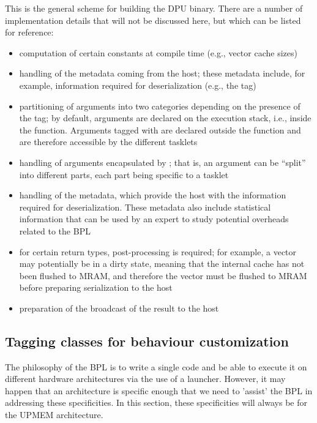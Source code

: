 This is the general scheme for building the DPU binary. There are a number of implementation details that will not be discussed here, but which can be listed for reference:

\begin{itemize}

\item computation of certain constants at compile time (e.g., vector cache sizes)

\item handling of the  metadata coming from the host; these metadata include, for example, information required for deserialization (e.g., the  tag)

\item partitioning of arguments into two categories depending on the presence of the  tag; by default, arguments are declared on the execution stack, i.e., inside the  function. Arguments tagged with  are declared outside the  function and are therefore accessible 
by the different tasklets

\item handling of arguments encapsulated by ; that is, an argument can be “split” into different parts, each part being specific to a tasklet

\item handling of the  metadata, which provide the host with the information required for deserialization. These metadata also include statistical information that can be used by an expert to study potential overheads related to the BPL

\item for certain return types, post-processing is required; for example, a vector may potentially be in a dirty state, meaning that the internal cache has not been flushed to MRAM, and therefore the vector must be flushed to MRAM before preparing serialization to the host

\item preparation of the broadcast of the result to the host

\end{itemize}	

\subsection{Tagging classes for behaviour customization}

The philosophy of the BPL is to write a single code and be able to execute it on different hardware architectures  via the use of a launcher. However, it may happen that an architecture is specific enough that we need to 'assist'  the BPL in addressing these specificities. In this section, these specificities will always be for the UPMEM architecture.

